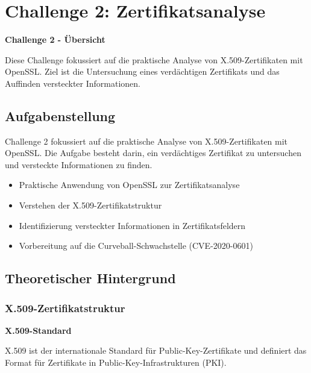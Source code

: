\documentclass{article}
\begin{document}
\clearpage



\section{Challenge 2: Zertifikatsanalyse}

\begin{solutionbox}
\textbf{Challenge 2 - Übersicht}

Diese Challenge fokussiert auf die praktische Analyse von X.509-Zertifikaten mit OpenSSL. Ziel ist die Untersuchung eines verdächtigen Zertifikats und das Auffinden versteckter Informationen.
\end{solutionbox}

\subsection{Aufgabenstellung}
Challenge 2 fokussiert auf die praktische Analyse von X.509-Zertifikaten mit OpenSSL. Die Aufgabe besteht darin, ein verdächtiges Zertifikat zu untersuchen und versteckte Informationen zu finden.

\begin{tcolorbox}[colback=thd-blue!10,colframe=thd-blue,title=\textbf{Ziele der Challenge}]
\begin{itemize}[leftmargin=1.5cm]
    \item Praktische Anwendung von OpenSSL zur Zertifikatsanalyse
    \item Verstehen der X.509-Zertifikatstruktur
    \item Identifizierung versteckter Informationen in Zertifikatsfeldern
    \item Vorbereitung auf die Curveball-Schwachstelle (CVE-2020-0601)
\end{itemize}
\end{tcolorbox}

\subsection{Theoretischer Hintergrund}

\subsubsection{X.509-Zertifikatstruktur}

\begin{infobox}
\textbf{X.509-Standard}

X.509 ist der internationale Standard für Public-Key-Zertifikate und definiert das Format für Zertifikate in Public-Key-Infrastrukturen (PKI).
\end{infobox}
\end{document}
